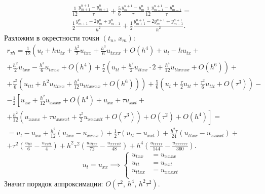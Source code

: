 \documentclass[a4paper]{article}
\begin{document}
\begin{sol}
\begin{multline*}
\frac{1}{12} \frac{y_{m+1}^{n+1}-y_{m+1}^n}{\tau}
+ \frac{5}{6} \frac{y_m^{n+1}-y_{m}^n}{\tau}
\frac{1}{12} \frac{y_{m-1}^{n+1}-y_{m-1}^n}{\tau}=\\
\frac{1}{2} \frac{y_{m+1}^n-2y_m^n+y_{m-1}^n}{h^2}+
\frac{1}{2} \frac{y_{m+1}^{n+1}-2y_m^{n+1}+y_{m-1}^{n+1}}{h^2}
.\end{multline*} 
Разложим в окрестности точки $\left( t_n,\,x_m \right) $:
\begin{multline*}
	r_{\tau h}= \frac{1}{12} \left( 
	u_t+h u_{t x}+ \frac{h^2}{2}u_{t xx}
+ \frac{h^3}{6}u_{t x x x}+ O\left( h^4 \right) 
+u_t-h u_{t x} \right. + \\ + \left. \frac{h^2}{2} u_{t x x}-
\frac{h^3}{6} u_{t x x x}+
O\left( h^4 \right) + \frac{\tau}{2}\left( 
u_{t t}+ \frac{h^2}{2}u_{t t x x}\cdot 2+
\frac{h^4}{12}u_{t t x x x x}+O\left( h^6 \right) \right) \right. + \\ + \left.
\frac{\tau^2}{6} \left( u_{t t t}+
h^2 u_{t t t x x}+ \frac{h^4}{12} u_{t t t x x x x}
+O\left( h^6 \right) \right) \right) +
\frac{5}{6}\left( u_t +\frac{\tau}{2}
u_{t t}+ \frac{\tau^2}{6}u_{t t t }+O\left( \tau^3 \right) \right) 
-\\-\frac{1}{2} \left[ 
u_{x x} + \frac{h^2}{12} u_{x x x x} +O\left( 
h^4\right) + u_{x x} +\tau u_{x x t}\right. + \\ + \left.
\frac{h^2}{12} \left( u_{x x x x}+\tau
u_{x x x x t}+ \frac{\tau^2}{2}u_{x x x x t t}+
O\left( \tau^3 \right) \right) +O\left( \tau^2 \right) +
O\left( h^4 \right) \right] =\\=
u_t -u_{xx} + \frac{h^2}{12} \left( u_{t x x}-
u_{x x x x}\right) +\frac{1}{2} \tau\left( 
u_{t t}- u_{x x t}\right) + \frac{h^2 \tau}{24}
\left( u_{t t x x}-u_{x x x x t}\right) +\\
+ \tau^2 \left( 
\frac{u_{t t t}}{6}- \frac{u_{x x t t}}{4}\right) +
h^2 \tau^2 \left( \frac{u_{t t t x x}}{72}-
\frac{u_{x x x x tt}}{48}\right) +
h^4 \left( \frac{u_{t x x x x}}{144}-
\frac{u_{x x x x x x}}{360}\right) .\end{multline*} 
\[
u_t=u_{x x} \implies \left\{
\begin{aligned}
u_{t x x }&= u_{x x x x} \\
u_{t t}&= u_{x x t}\\
u_{t t x x}&= u_{x x x x t} \\
\end{aligned}
\right.
\]
Значит порядок аппроксимации: $O\left( \tau^2,\,h^4,\,
h^2 \tau^2\right) $.


\end{sol}
\end{document}
